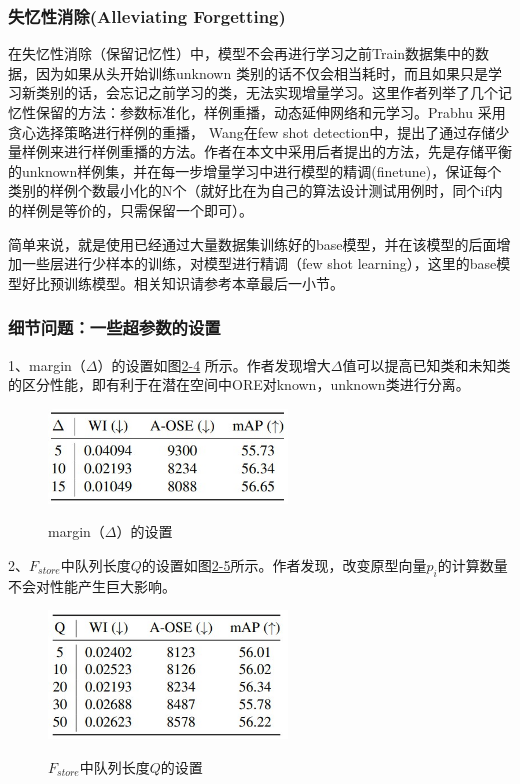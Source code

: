 \subsubsection{失忆性消除(Alleviating Forgetting)}

在失忆性消除（保留记忆性）中，模型不会再进行学习之前Train数据集中的数据，因为如果从头开始训练unknown 类别的话不仅会相当耗时，而且如果只是学习新类别的话，会忘记之前学习的类，无法实现增量学习。这里作者列举了几个记忆性保留的方法：参数标准化，样例重播，动态延伸网络和元学习。Prabhu\cite{prabhu2020gdumb} 采用贪心选择策略进行样例的重播， Wang\cite{wang2020frustratingly}在few shot detection中，提出了通过存储少量样例来进行样例重播的方法。作者在本文中采用后者提出的方法，先是存储平衡的unknown样例集，并在每一步增量学习中进行模型的精调(finetune)，保证每个类别的样例个数最小化的N个（就好比在为自己的算法设计测试用例时，同个if内的样例是等价的，只需保留一个即可）。

简单来说，就是使用已经通过大量数据集训练好的base模型，并在该模型的后面增加一些层进行少样本的训练，对模型进行精调（few shot learning），这里的base模型好比预训练模型。相关知识请参考本章最后一小节。

\subsubsection{细节问题：一些超参数的设置}

1、margin（$\Delta$）的设置如图\href{fig:2-4}{2-4} 所示。作者发现增大$\Delta$值可以提高已知类和未知类的区分性能，即有利于在潜在空间中ORE对known，unknown类进行分离。

\begin{figure}
  \centering
  \includegraphics[width=2.5in]{figure/example/ORE2.jpg}\\
  \caption{margin（$\Delta$）的设置}
  \label{fig:2-4}
\end{figure}

2、$F_{store}$中队列长度$Q$的设置如图\href{fig:2-5}{2-5}所示。作者发现，改变原型向量$p_i$的计算数量不会对性能产生巨大影响。
\begin{figure}
  \centering
  \includegraphics[width=2.5in]{figure/example/ORE1.jpg}\\
  \caption{$F_{store}$中队列长度$Q$的设置}
  \label{fig:2-5}
\end{figure}

